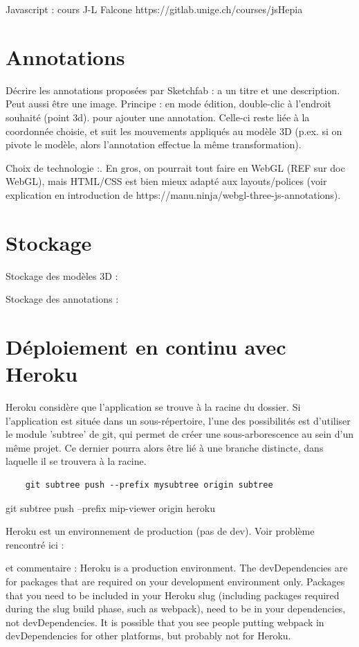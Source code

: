 Javascript : cours J-L Falcone https://gitlab.unige.ch/courses/jsHepia


\section{Annotations}

Décrire les annotations proposées par Sketchfab : a un titre et une description. Peut aussi être une image.
Principe : en mode édition, double-clic à l'endroit souhaité (point 3d). pour ajouter une annotation. Celle-ci reste liée à la coordonnée choisie, et suit les mouvements appliqués au modèle 3D (p.ex. si on pivote le modèle, alors l'annotation effectue la même transformation).

Choix de technologie :. En gros, on pourrait tout faire en WebGL (REF sur doc WebGL), mais HTML/CSS est bien mieux adapté aux layouts/polices (voir explication en introduction de https://manu.ninja/webgl-three-js-annotations).

\section{Stockage}
Stockage des modèles 3D :

Stockage des annotations :

\section{Déploiement en continu avec Heroku}

Heroku considère que l'application se trouve à la racine du dossier.
Si l'application est située dans un sous-répertoire, l'une des possibilités est d'utiliser le module 'subtree' de git, qui permet de créer une sous-arborescence au sein d'un même projet. Ce dernier pourra alors être lié à une branche distincte, dans laquelle il se trouvera à la racine.
\begin{verbatim}
    git subtree push --prefix mysubtree origin subtree
\end{verbatim}

git subtree push --prefix mip-viewer origin heroku

Heroku est un environnement de production (pas de dev). Voir problème rencontré ici :

et commentaire :
Heroku is a production environment. The devDependencies are for packages that are required on your development environment only. Packages that you need to be included in your Heroku slug (including packages required during the slug build phase, such as webpack), need to be in your dependencies, not devDependencies. It is possible that you see people putting webpack in devDependencies for other platforms, but probably not for Heroku. 

